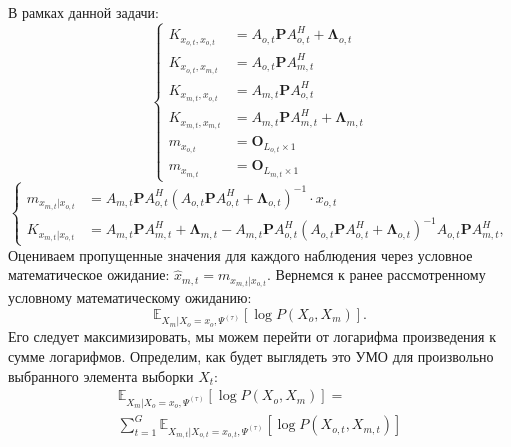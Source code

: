 \documentclass[11pt]{article}
\newcommand{\Expect}{\mathbb{E}}
\begin{document}
В рамках данной задачи:
\begin{equation}
\left\{ \begin{aligned} 
K_{x_{o,t},x_{o,t}} &= A_{o,t}\mathbf{P} A_{o,t}^H +\mathbf{\Lambda}_{o,t} \\
K_{x_{o,t},x_{m,t}} &= A_{o,t}\mathbf{P} A_{m,t}^H \\
K_{x_{m,t},x_{o,t}} &= A_{m,t}\mathbf{P} A_{o,t}^H \\
K_{x_{m,t},x_{m,t}} &= A_{m,t}\mathbf{P} A_{m,t}^H + \mathbf{\Lambda}_{m,t} \\
m_{x_{o,t}}&=\mathbf{O}_{L_{o,t} \times 1} \\
m_{x_{m,t}}&=\mathbf{O}_{L_{m,t} \times 1}
\end{aligned} \right.
\end{equation}
\begin{equation}
\left\{ 
\begin{aligned}
 m_{x_{m,t}|x_{o,t}} &= A_{m,t}\mathbf{P} A_{o,t}^H(A_{o,t}\mathbf{P} A_{o,t}^H + \mathbf{\Lambda}_{o,t})^{-1}\cdot x_{o,t} \\
K_{x_{m,t}|x_{o,t}} &= A_{m,t}\mathbf{P} A_{m,t}^H + \mathbf{\Lambda}_{m,t}-A_{m,t}\mathbf{P} A_{o,t}^H(A_{o,t}\mathbf{P} A_{o,t}^H + \mathbf{\Lambda}_{o,t})^{-1}A_{o,t}\mathbf{P} A_{m,t}^H,
\end{aligned}
\right.
\end{equation}
Оцениваем пропущенные значения для каждого наблюдения через условное математическое ожидание:
$\hat{x}_{m,t} = m_{x_{m,t}|x_{o,t}}$.
Вернемся к ранее рассмотренному условному математическому ожиданию:
\begin{equation*}
 \Expect_{X_m|X_o=x_o, \Psi^{(\tau)}}[\log P(X_o, X_m)].
\end{equation*}
Его следует максимизировать, мы можем перейти от логарифма произведения к сумме логарифмов. Определим, как будет выглядеть это УМО для произвольно выбранного элемента выборки $X_t$:
\begin{equation*}
\begin{gathered}
 \Expect_{X_m|X_o=x_o, \Psi^{(\tau)}}[\log P(X_o, X_m)] = \\
 \sum_{t=1}^G\Expect_{X_{m,t}|X_{o,t}=x_{o,t}, \Psi^{(\tau)}}[\log P(X_{o,t}, X_{m,t})]
\end{gathered}
\end{equation*}
\\
\\
\end{document}

